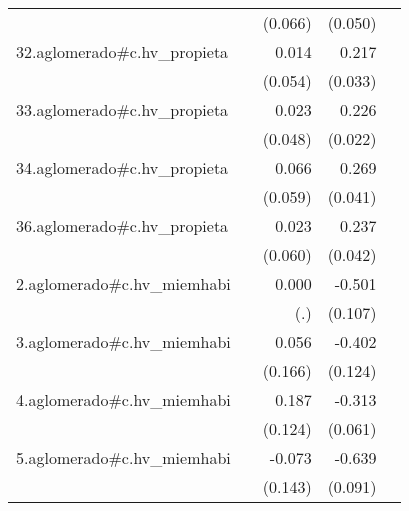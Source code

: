 {\begin{longtable}{l*{4}{D{.}{.}{-1}}}
            &                     &     (0.066)         &     (0.050)         &                     \\
\addlinespace
32.aglomerado#c.hv\_propieta&                     &       0.014         &       0.217\sym{***}&                     \\
            &                     &     (0.054)         &     (0.033)         &                     \\
\addlinespace
33.aglomerado#c.hv\_propieta&                     &       0.023         &       0.226\sym{***}&                     \\
            &                     &     (0.048)         &     (0.022)         &                     \\
\addlinespace
34.aglomerado#c.hv\_propieta&                     &       0.066         &       0.269\sym{***}&                     \\
            &                     &     (0.059)         &     (0.041)         &                     \\
\addlinespace
36.aglomerado#c.hv\_propieta&                     &       0.023         &       0.237\sym{***}&                     \\
            &                     &     (0.060)         &     (0.042)         &                     \\
\addlinespace
2.aglomerado#c.hv\_miemhabi&                     &       0.000         &      -0.501\sym{***}&                     \\
            &                     &         (.)         &     (0.107)         &                     \\
\addlinespace
3.aglomerado#c.hv\_miemhabi&                     &       0.056         &      -0.402\sym{**} &                     \\
            &                     &     (0.166)         &     (0.124)         &                     \\
\addlinespace
4.aglomerado#c.hv\_miemhabi&                     &       0.187         &      -0.313\sym{***}&                     \\
            &                     &     (0.124)         &     (0.061)         &                     \\
\addlinespace
5.aglomerado#c.hv\_miemhabi&                     &      -0.073         &      -0.639\sym{***}&                     \\
            &                     &     (0.143)         &     (0.091)         &                     \\

\end{longtable}}
